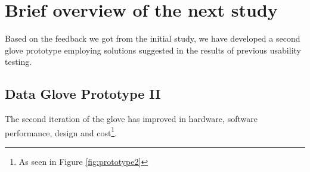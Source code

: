 \chapter{Brief overview of the next study}

Based on the feedback we got from the initial study, we have developed a second glove prototype employing solutions suggested in the results of previous usability testing. 

\section{Data Glove Prototype II}

The second iteration of the glove has improved in hardware, software performance, design and cost\footnote{As seen in Figure \ref{fig:prototype2}}.

